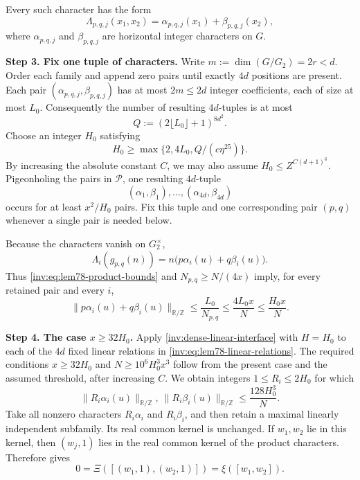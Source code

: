 \documentclass[twoside]{aomart}
\makeatletter
\theoremstyle{paperplain}
\theoremstyle{paperdefinition}
\renewenvironment{proof}[1][\proofname]{\par\pushQED{\qed}%
  \normalfont\topsep6\p@\@plus3\p@\relax\trivlist
  \item[\hskip\labelsep\itshape #1\@addpunct{.}]\ignorespaces
}{\popQED\endtrivlist\@endpefalse}
\numberwithin{equation}{section}
\makeatother
\begin{document}
\begin{proof}
Every such character has the form
\[
 \Lambda_{p,q,j}(x_1,x_2)
 =\alpha_{p,q,j}(x_1)+\beta_{p,q,j}(x_2),
\]
where $\alpha_{p,q,j}$ and $\beta_{p,q,j}$ are horizontal integer
characters on $G$.

\par
\medskip
\noindent\textbf{Step 3. Fix one tuple of characters.}
Write $m:=\dim(G/G_2)=2r<d$. Order each family and append zero pairs until exactly $4d$ positions are present. Each pair
$(\alpha_{p,q,j},\beta_{p,q,j})$ has at most $2m\le2d$ integer
coefficients, each of size at most $L_0$. Consequently the number of
resulting $4d$-tuples is at most
\begin{equation*}
 Q:=(2\lfloor L_0\rfloor+1)^{8d^2}.
\end{equation*}
Choose an integer $H_0$ satisfying
\[
 H_0\ge\max\{2,4L_0,Q/(c\eta^{25})\}.
\]
By increasing the absolute constant $C$, we may also assume
$H_0\le Z^{C(d+1)^6}$. Pigeonholing the pairs in $\mathcal P$, one resulting $4d$-tuple
\[
 (\alpha_1,\beta_1),\ldots,(\alpha_{4d},\beta_{4d})
\]
occurs for at least $x^2/H_0$ pairs. Fix this tuple and one corresponding
pair $(p,q)$ whenever a single pair is needed below.

Because the characters vanish on $G_2^\times$,
\[
 \Lambda_i(g_{p,q}(n))
 =n\bigl(p\alpha_i(u)+q\beta_i(u)\bigr).
\]
Thus \eqref{inv:eq:lem78-product-bounds} and
$N_{p,q}\ge N/(4x)$ imply, for every retained pair and every $i$,
\begin{equation}
 \|p\alpha_i(u)+q\beta_i(u)\|_{\mathbb R/\mathbb Z}
 \le\frac{L_0}{N_{p,q}}
 \le\frac{4L_0x}{N}
 \le\frac{H_0x}{N}.
\label{inv:eq:lem78-linear-relations}
\end{equation}

\par
\medskip
\noindent\textbf{Step 4. The case $x\ge32H_0$.}
Apply \eqref{inv:dense-linear-interface} with $H=H_0$ to each of the
$4d$ fixed linear relations in \eqref{inv:eq:lem78-linear-relations}.
The required conditions $x\ge32H_0$ and
$N\ge10^6H_0^3x^3$ follow from the present case and the assumed
threshold, after increasing $C$. We obtain integers
$1\le R_i\le2H_0$ for which
\begin{equation*}
 \|R_i\alpha_i(u)\|_{\mathbb R/\mathbb Z},\
 \|R_i\beta_i(u)\|_{\mathbb R/\mathbb Z}
 \le\frac{128H_0^3}{N}.
\end{equation*}
Take all nonzero characters $R_i\alpha_i$ and $R_i\beta_i$, and then
retain a maximal linearly independent subfamily. Its real common kernel
is unchanged. If $w_1,w_2$ lie in this kernel, then
$(w_j,1)$ lies in the real common kernel of the product characters.
Therefore \Cref{inv:vertical-kernel} gives
\[
 0=\Xi([(w_1,1),(w_2,1)])=\xi([w_1,w_2]).
\]


\end{proof}
\end{document}
